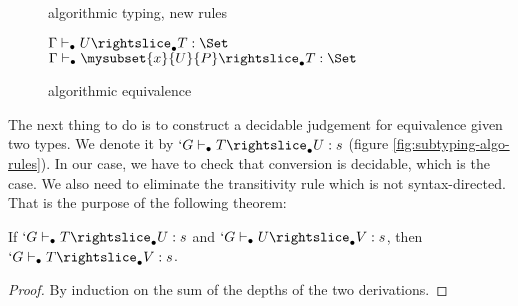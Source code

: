 \documentclass{llncs}
\renewcommand{\SubSubAs}[1][\Gamma]{%
\UAX{SubSub}
{$\subalgoimpl{#1}{c}{U}{T}{\Set}$}
{$\subalgoimpl{#1}{c[\eltpit~\ctxdot]}{\mysubset{x}{U}{P}}{T}{\Set}$}
{}
}
\begin{document}
\begin{paragraph}{}
\begin{figure*}[t]
\begin{center}
  \end{center}
  \vspace{-2em}
  \caption{\Russell{} algorithmic typing, new rules}
  \label{fig:typing-algo-rules}
\end{figure*}


\begin{figure*}
    \def\fCenter{\suba}
    \def\type{\typea}
    \def\sub{\suba}
    \begin{center}
    \SubConvA\DP 

    \vspace{\infvspace}
    \SubHnfA\DP

    \vspace{\infvspace}
    \SubProdA\DP

    \vspace{\infvspace}
    \SubSigmaA\DP

    \vspace{\infvspace}
    \SubProofA\DP

    \vspace{\infvspace}
    \SubSubAs\DP
  \end{center}
  \vspace{-2em}
  \caption{\Russell{} algorithmic equivalence}
  \label{fig:subtyping-algo-rules}
  \vspace{-1em}
\end{figure*}


\end{paragraph}
\begin{paragraph}{}
  The next thing to do is to construct a decidable judgement for
  equivalence given two types. We denote it by $`G \typea T
  \suba U : s$ (figure \vref{fig:subtyping-algo-rules}).
  In our case, we have to check that conversion is decidable, which is the
  case. We also need to eliminate the transitivity rule which is not
  syntax-directed. That is the purpose of the following theorem:
\begin{theorem}
  If $`G \typea T \suba U : s$ and $`G \typea U \suba V : s$, then $`G \typea T
  \suba V : s$.
\end{theorem}
\begin{proof}
  By induction on the sum of the depths of the two derivations.
\end{proof}
\end{paragraph}
\end{document}
